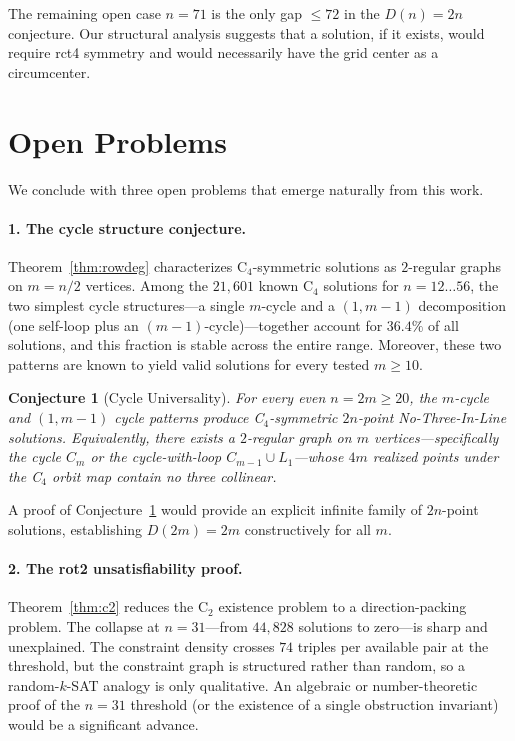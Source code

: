 \documentclass[11pt,a4paper]{article}
\theoremstyle{plain}
\newtheorem{conjecture}[theorem]{Conjecture}
\theoremstyle{definition}
\begin{document}
The remaining open case $n=71$ is the only gap $\le 72$ in the $D(n)=2n$ conjecture. Our structural analysis suggests that a solution, if it exists, would require rct4 symmetry and would necessarily have the grid center as a circumcenter.

\section*{Open Problems}
\label{sec:open}

We conclude with three open problems that emerge naturally from this work.

\paragraph{1. The cycle structure conjecture.}
Theorem~\ref{thm:rowdeg} characterizes C$_4$-symmetric solutions as $2$-regular graphs on $m=n/2$ vertices. Among the $21{,}601$ known C$_4$ solutions for $n=12\dots56$, the two simplest cycle structures---a single $m$-cycle and a $(1,m-1)$ decomposition (one self-loop plus an $(m-1)$-cycle)---together account for $36.4\%$ of all solutions, and this fraction is stable across the entire range. Moreover, these two patterns are known to yield valid solutions for every tested $m\ge 10$.

\begin{conjecture}[Cycle Universality]
\label{conj:cycle}
For every even $n=2m\ge 20$, the $m$-cycle and $(1,m-1)$ cycle patterns produce C$_4$-symmetric $2n$-point No-Three-In-Line solutions. Equivalently, there exists a $2$-regular graph on $m$ vertices---specifically the cycle $C_m$ or the cycle-with-loop $C_{m-1}\cup L_1$---whose $4m$ realized points under the C$_4$ orbit map contain no three collinear.
\end{conjecture}

A proof of Conjecture~\ref{conj:cycle} would provide an explicit infinite family of $2n$-point solutions, establishing $D(2m)=2m$ constructively for all $m$.

\paragraph{2. The rot2 unsatisfiability proof.}
Theorem~\ref{thm:c2} reduces the C$_2$ existence problem to a direction-packing problem. The collapse at $n=31$---from $44{,}828$ solutions to zero---is sharp and unexplained. The constraint density crosses $74$ triples per available pair at the threshold, but the constraint graph is structured rather than random, so a random-$k$-SAT analogy is only qualitative. An algebraic or number-theoretic proof of the $n=31$ threshold (or the existence of a single obstruction invariant) would be a significant advance.
\end{document}
